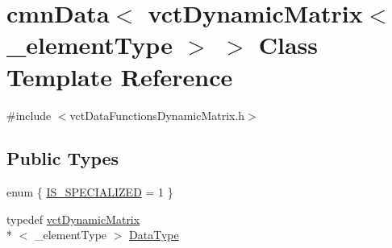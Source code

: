 \hypertarget{classcmn_data_3_01vct_dynamic_matrix_3_01__element_type_01_4_01_4}{\section{cmn\-Data$<$ vct\-Dynamic\-Matrix$<$ \-\_\-element\-Type $>$ $>$ Class Template Reference}
\label{classcmn_data_3_01vct_dynamic_matrix_3_01__element_type_01_4_01_4}
}


{\ttfamily \#include $<$vct\-Data\-Functions\-Dynamic\-Matrix.\-h$>$}

\subsection*{Public Types}
\begin{DoxyCompactItemize}
\item 
enum \{ \hyperlink{classcmn_data_3_01vct_dynamic_matrix_3_01__element_type_01_4_01_4_aef8d134adbdf78f3bda65daf485c2bd6abf692d4df8b5d1c66f90c50c64a9edc8}{I\-S\-\_\-\-S\-P\-E\-C\-I\-A\-L\-I\-Z\-E\-D} = 1
 \}
\item 
typedef \hyperlink{classvct_dynamic_matrix}{vct\-Dynamic\-Matrix}\\*
$<$ \-\_\-element\-Type $>$ \hyperlink{classcmn_data_3_01vct_dynamic_matrix_3_01__element_type_01_4_01_4_aac077247ac3ce4c624c4636509abe930}{Data\-Type}
\end{DoxyCompactItemize}
